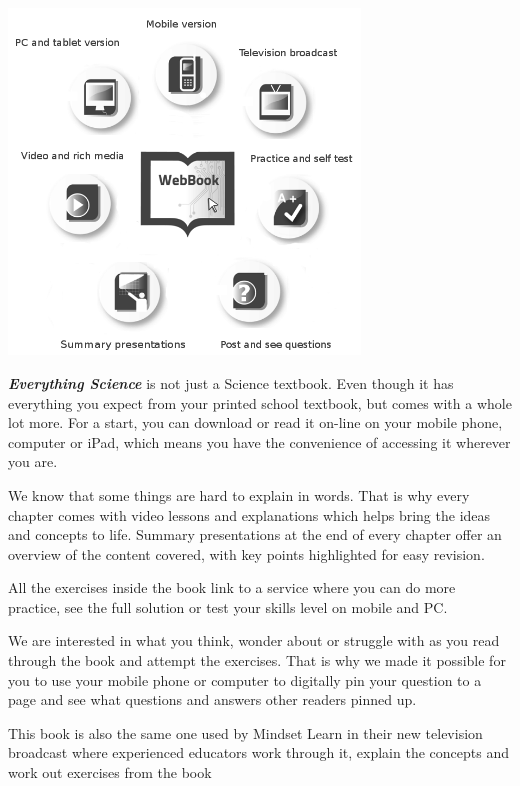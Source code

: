 \begin{center}
\includegraphics[width=0.70\textwidth]{title_images/morethantextbook.png}
\end{center}

\par
{\Large
\textbf{\textit{Everything Science}} is not just a Science textbook. Even though it has everything you expect from
your printed school textbook, but comes with a whole lot more. For a start, you can download or read it
on-line on your mobile phone, computer or iPad, which means you have the convenience of accessing
it wherever you are.\par


We know that some things are hard to explain in words. That is why every chapter comes with video
lessons and explanations which helps bring the ideas and concepts to life. Summary presentations at
the end of every chapter offer an overview of the content covered, with key points highlighted for easy
revision.\par


All the exercises inside the book link to a service where you can do more practice, see the full solution
or test your skills level on mobile and PC.\par


We are interested in what you think, wonder about or struggle with as you read through the book and
attempt the exercises. That is why we made it possible for you to use your mobile phone or computer to
digitally pin your question to a page and see what questions and answers other readers pinned up.\par


This book is also the same one used by Mindset Learn in their new television broadcast where
experienced educators work through it, explain the concepts and work out exercises from the book
}




